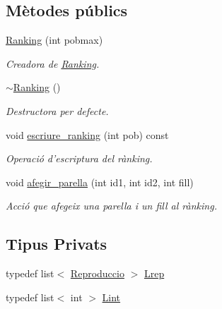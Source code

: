 \subsection*{Mètodes públics}
\begin{DoxyCompactItemize}
\item 
\hyperlink{class_ranking_a904a2cceb9f1662e3fe1510f3121d95f}{Ranking} (int pobmax)
\begin{DoxyCompactList}\small\item\em Creadora de \hyperlink{class_ranking}{Ranking}. \end{DoxyCompactList}\item 
\hyperlink{class_ranking_aa350c65acea82ec0ac42ec80db8bc00f}{$\sim$\-Ranking} ()
\begin{DoxyCompactList}\small\item\em Destructora per defecte. \end{DoxyCompactList}\item 
void \hyperlink{class_ranking_aba7a9802d6d3881a19d6fb136b705e07}{escriure\-\_\-ranking} (int pob) const 
\begin{DoxyCompactList}\small\item\em Operació d'escriptura del rànking. \end{DoxyCompactList}\item 
void \hyperlink{class_ranking_a10b14da6a47f06eccff565a2d490b5fe}{afegir\-\_\-parella} (int id1, int id2, int fill)
\begin{DoxyCompactList}\small\item\em Acció que afegeix una parella i un fill al rànking. \end{DoxyCompactList}\end{DoxyCompactItemize}
\subsection*{Tipus Privats}
\begin{DoxyCompactItemize}
\item 
typedef list$<$ \hyperlink{struct_ranking_1_1_reproduccio}{Reproduccio} $>$ \hyperlink{class_ranking_a6cdd02db4b2c2187ae5d7294330b9189}{Lrep}
\item 
typedef list$<$ int $>$ \hyperlink{class_ranking_ae94c085922b0f7f31630308dcb2a61ba}{Lint}
\end{DoxyCompactItemize}
